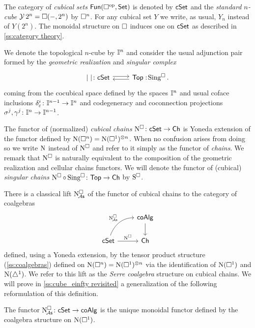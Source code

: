 The category of \textit{cubical sets} $\mathsf{Fun}(\square^{\mathrm{op}}, \mathsf{Set})$ is denoted by $\mathsf{cSet}$ and
the \textit{standard $n$-cube} $\operatorname{\mathcal{Y}} 2^n = \square(-, 2^n)$ by $\square^n$.
For any cubical set $Y$ we write, as usual, $Y_n$ instead of $Y(2^n)$.
The monoidal structure on $\square$ induces one on $\mathsf{cSet}$ as described in \cref{ss:category theory}.

We denote the topological $n$-cube by $\mathbb{I}^{n}$ and consider the usual adjunction pair formed by the \textit{geometric realization} and \textit{singular complex}
\[
\begin{tikzcd}
	\bars{\ } \colon \cSet \arrow[r, shift left=.5ex] &
	\Top :\! \cSing. \arrow[l, shift left=.5ex]
\end{tikzcd}
\]
coming from the cocubical space defined by the spaces $\mathbb{I}^n$ and usual coface inclusions $\delta^i_{\varepsilon} \colon \mathbb{I}^{n-1} \to \mathbb{I}^n$ and codegeneracy and coconnection projections $\sigma^j, \gamma^j \colon \mathbb{I}^n \to \mathbb{I}^{n-1}$.


The functor of (normalized) \textit{cubical chains} $\operatorname{N^{\square}} \colon \mathsf{cSet} \to \mathsf{Ch}$ is Yoneda extension of the functor defined by $\operatorname{N}(\square^n) = \operatorname{N}(\square^1)^{\otimes n}$.
When no confusion arises from doing so we write $\operatorname{N}$ instead of $\operatorname{N^{\square}}$ and refer to it simply as the functor of \textit{chains}.
We remark that $\operatorname{N^{\square}}$ is naturally equivalent to the composition of the geometric realization and cellular chains functors.
We will denote the functor of (cubical) \textit{singular chains} $\operatorname{N^{\square}} \circ \operatorname{Sing^{\square}} \colon \mathsf{Top} \to \mathsf{Ch}$ by $\operatorname{S^{\square}}$.

There is a classical lift $\operatorname{N^{\square}_{\!{\mathcal{A}\mathsf{s}}}}$ of the functor of cubical chains to the category of coalgebras
\[
\begin{tikzcd}
	& \coAlg \arrow[d] \\
	\cSet \arrow[r, "\cchains"] \arrow[ur, "\cchainsA", out=70, in=180] & \Ch
\end{tikzcd}
\]
defined, using a Yoneda extension, by the tensor product structure (\cref{ss:coalgebras}) defined on $\operatorname{N}(\square^n) = \operatorname{N}(\square^1)^{\otimes n}$ via the identification of $\operatorname{N}(\square^1)$ and $\operatorname{N}(\triangle^1)$.
We refer to this lift as the \textit{Serre coalgebra} structure on cubical chains.
We will prove in \cref{ss:cube_einfty revisited} a generalization of the following reformulation of this definition.

\begin{proposition}\label{p:serre coalgebra}
	The functor $\operatorname{N^{\square}_{\!{\mathcal{A}\mathsf{s}}}} \colon \mathsf{cSet} \to \mathsf{coAlg}$ is the unique monoidal functor defined by the coalgebra structure on $\operatorname{N}(\square^1)$.
\end{proposition}